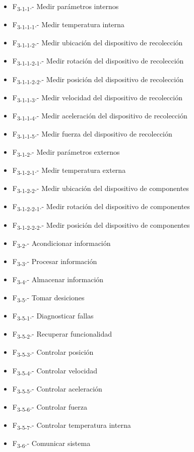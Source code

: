 \begin{itemize}
\item F\textsubscript{3-1-1}.- Medir par\'ametros internos
\item F\textsubscript{3-1-1-1}.- Medir temperatura interna
\item F\textsubscript{3-1-1-2}.- Medir ubicaci\'on del dispositivo de recolecci\'on
\item F\textsubscript{3-1-1-2-1}.- Medir rotaci\'on del dispositivo de recolecci\'on
\item F\textsubscript{3-1-1-2-2}.- Medir posici\'on del dispositivo de recolecci\'on
\item F\textsubscript{3-1-1-3}.- Medir velocidad del dispositivo de recolecci\'on
\item F\textsubscript{3-1-1-4}.- Medir aceleraci\'on del dispositivo de recolecci\'on
\item F\textsubscript{3-1-1-5}.- Medir fuerza del dispositivo de recolecci\'on
\item F\textsubscript{3-1-2}.- Medir par\'ametros externos
\item F\textsubscript{3-1-2-1}.- Medir temperatura externa
\item F\textsubscript{3-1-2-2}.- Medir ubicaci\'on del dispositivo de componentes
\item F\textsubscript{3-1-2-2-1}.- Medir rotaci\'on del dispositivo de componentes
\item F\textsubscript{3-1-2-2-2}.- Medir posici\'on del dispositivo de componentes
\item F\textsubscript{3-2}.- Acondicionar informaci\'on
\item F\textsubscript{3-3}.- Procesar informaci\'on
\item F\textsubscript{3-4}.- Almacenar informaci\'on
\item F\textsubscript{3-5}.- Tomar desiciones
\item F\textsubscript{3-5-1}.- Diagnosticar fallas
\item F\textsubscript{3-5-2}.- Recuperar funcionalidad
\item F\textsubscript{3-5-3}.- Controlar posici\'on
\item F\textsubscript{3-5-4}.- Controlar velocidad
\item F\textsubscript{3-5-5}.- Controlar aceleraci\'on
\item F\textsubscript{3-5-6}.- Controlar fuerza
\item F\textsubscript{3-5-7}.- Controlar temperatura interna
\item F\textsubscript{3-6}.- Comunicar sistema

\end{itemize}
